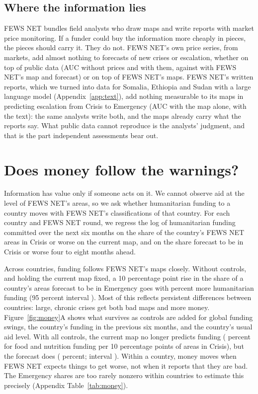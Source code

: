 \documentclass[11pt]{article}
\begin{document}
\subsection{Where the information lies}

FEWS NET bundles field analysts who draw maps and write reports with market price monitoring. If a funder could buy the information more cheaply in pieces, the pieces should carry it. They do not. FEWS NET's own price series, from \prMarketsFews{} markets, add almost nothing to forecasts of new crises or escalation, whether on top of public data (AUC \pvNewRaw{} without prices and \pvNewRawBoth{} with them, against \pvNewRawMap{} with FEWS NET's map and forecast) or on top of FEWS NET's maps. FEWS NET's written reports, which we turned into data for Somalia, Ethiopia and Sudan with a large language model (Appendix~\ref{app:text}), add nothing measurable to its maps in predicting escalation from Crisis to Emergency (AUC \txtAucMap{} with the map alone, \txtAucMapText{} with the text): the same analysts write both, and the maps already carry what the reports say. What public data cannot reproduce is the analysts' judgment, and that is the part independent assessments bear out.

\FloatBarrier
\section{Does money follow the warnings?}\label{sec:money}

Information has value only if someone acts on it. We cannot observe aid at the level of FEWS NET's areas, so we ask whether humanitarian funding to a country moves with FEWS NET's classifications of that country. For each country and FEWS NET round, we regress the log of humanitarian funding committed over the next six months on the share of the country's FEWS NET areas in Crisis or worse on the current map, and on the share forecast to be in Crisis or worse four to eight months ahead.

Across countries, funding follows FEWS NET's maps closely. Without controls, and holding the current map fixed, a 10 percentage point rise in the share of a country's areas forecast to be in Emergency goes with \aidAllFourFcPool{} percent more humanitarian funding (95 percent interval \aidAllFourFcPoolCi{}). Most of this reflects persistent differences between countries: large, chronic crises get both bad maps and more money. Figure~\ref{fig:money}A shows what survives as controls are added for global funding swings, the country's funding in the previous six months, and the country's usual aid level. With all controls, the current map no longer predicts funding (\aidFoodThreeCurWithin{} percent for food and nutrition funding per 10 percentage points of areas in Crisis), but the forecast does (\aidFoodThreeFcWithin{} percent; interval \aidFoodThreeFcWithinCi{}). Within a country, money moves when FEWS NET expects things to get worse, not when it reports that they are bad. The Emergency shares are too rarely nonzero within countries to estimate this precisely (Appendix Table~\ref{tab:money}).
\end{document}
